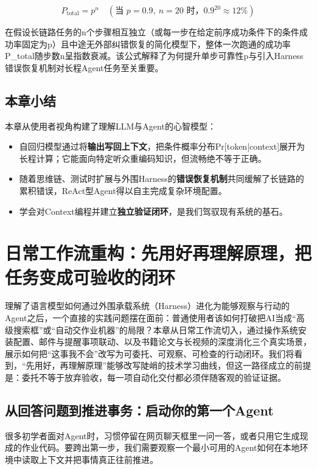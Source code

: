\documentclass[UTF8,a4paper,11pt,fontset=fandol]{ctexart}
\begin{document}
\[
P_{\text{total}} = p^n \quad (\text{当 } p=0.9,\ n=20 \text{ 时，} 0.9^{20} \approx 12\%)
\]

在假设长链路任务的n个步骤相互独立（或每一步在给定前序成功条件下的条件成功率固定为p）且中途无外部纠错恢复的简化模型下，整体一次跑通的成功率P\_total随步数n呈指数衰减。该公式解释了为何提升单步可靠性p与引入Harness错误恢复机制对长程Agent任务至关重要。

\subsection{本章小结}

本章从使用者视角构建了理解LLM与Agent的心智模型：

\begin{itemize}
\item 自回归模型通过将\textbf{输出写回上下文}，把条件概率分布Pr[token|context]展开为长程计算；它能面向特定听众重编码知识，但流畅绝不等于正确。

\item 随着思维链、测试时扩展与外围Harness的\textbf{错误恢复机制}共同缓解了长链路的累积错误，ReAct型Agent得以自主完成复杂环境配置。

\item 学会对Context编程并建立\textbf{独立验证闭环}，是我们驾驭现有系统的基石。
\end{itemize}

\section{日常工作流重构：先用好再理解原理，把任务变成可验收的闭环}

理解了语言模型如何通过外围承载系统（Harness）进化为能够观察与行动的Agent之后，一个直接的实践问题摆在面前：普通使用者该如何打破把AI当成“高级搜索框”或“自动交作业机器”的局限？本章从日常工作流切入，通过操作系统安装配置、邮件与提醒事项联动、以及书籍论文与长视频的深度消化三个真实场景，展示如何把“这事我不会”改写为可委托、可观察、可检查的行动闭环。我们将看到，“先用好，再理解原理”能够改写陡峭的技术学习曲线，但这一路径成立的前提是：委托不等于放弃验收，每一项自动化交付都必须伴随客观的验证证据。

\subsection{从回答问题到推进事务：启动你的第一个Agent}

很多初学者面对Agent时，习惯停留在网页聊天框里一问一答，或者只用它生成现成的作业代码。要跨出第一步，我们需要观察一个最小可用的Agent如何在本地环境中读取上下文并把事情真正往前推进。
\end{document}
